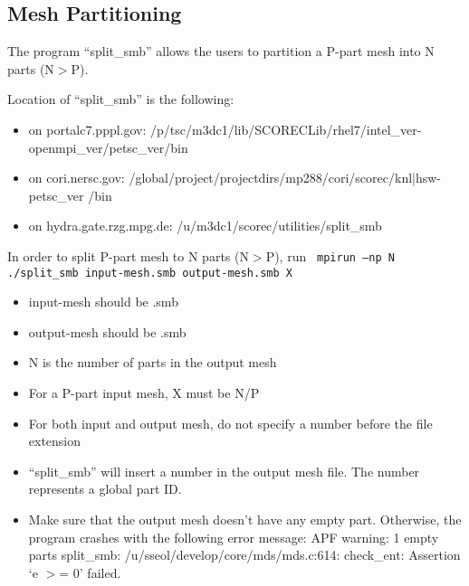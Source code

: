 \subsection{Mesh Partitioning}

The program “split\_smb” allows the users to partition a P-part mesh into N parts (N$>$P). 

Location of “split\_smb” is the following:
\begin{itemize}
\item	on portalc7.pppl.gov: /p/tsc/m3dc1/lib/SCORECLib/rhel7/intel\_ver-openmpi\_ver/petsc\_ver/bin
\item	on cori.nersc.gov:  /global/project/projectdirs/mp288/cori/scorec/knl|hsw-petsc\_ver /bin
\item	on hydra.gate.rzg.mpg.de: /u/m3dc1/scorec/utilities/split\_smb
\end{itemize}

In order to split P-part mesh to N parts (N$>$P), run
\texttt{
mpirun –np N ./split\_smb input-mesh.smb output-mesh.smb X 
}
\begin{itemize}
\item	input-mesh should be .smb 
\item	output-mesh should be .smb
\item	N is the number of parts in the output mesh
\item	For a P-part input mesh, X must be N/P
\item	For both input and output mesh, do not specify a number before the file extension
\item	“split\_smb” will insert a number in the output mesh file. The number represents a global part ID.
\item	Make sure that the output mesh doesn’t have any empty part. Otherwise, the program crashes with the following error message:
\newline
APF warning: 1 empty parts
\newline
split\_smb: /u/sseol/develop/core/mds/mds.c:614: check\_ent: Assertion `e $>$= 0' failed.
\end{itemize}

